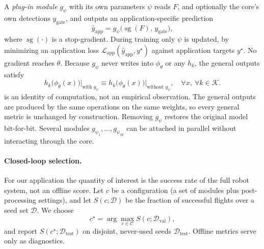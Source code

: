 \documentclass[10pt,twocolumn,letterpaper]{article}
\begin{document}
A \emph{plug-in module} $g_\psi$ with its own parameters $\psi$ reads $F$, and optionally the core's own detections $y_{\text{gate}}$, and outputs an application-specific prediction
\begin{equation}
  \hat{y}_{\text{app}} = g_\psi\big(\operatorname{sg}(F),\, y_{\text{gate}}\big),
  \label{eq:module}
\end{equation}
where $\operatorname{sg}(\cdot)$ is a stop-gradient. During training only $\psi$ is updated, by minimizing an application loss $\mathcal{L}_{\text{app}}(\hat{y}_{\text{app}}, y^\star)$ against application targets $y^\star$. No gradient reaches $\theta$. Because $g_\psi$ never writes into $\phi_\theta$ or any $h_k$, the general outputs satisfy
\begin{equation}
  h_k\big(\phi_\theta(x)\big)\big|_{\text{with } g_\psi} \equiv h_k\big(\phi_\theta(x)\big)\big|_{\text{without } g_\psi}, \quad \forall x,\ \forall k \in \mathcal{K}.
  \label{eq:nonregression}
\end{equation}
 is an identity of computation, not an empirical observation. The general outputs are produced by the same operations on the same weights, so every general metric is unchanged by construction. Removing $g_\psi$ restores the original model bit-for-bit. Several modules $g_{\psi_1},\dots,g_{\psi_M}$ can be attached in parallel without interacting through the core.

\paragraph{Closed-loop selection.}
For our application the quantity of interest is the success rate of the full robot system, not an offline score. Let $c$ be a configuration (a set of modules plus post-processing settings), and let $S(c; \mathcal{D})$ be the fraction of successful flights over a seed set $\mathcal{D}$. We choose
\begin{equation}
  c^\star = \arg\max_{c \in \mathcal{C}} S(c; \mathcal{D}_{\text{val}}),
  \label{eq:selection}
\end{equation}
and report $S(c^\star; \mathcal{D}_{\text{test}})$ on disjoint, never-used seeds $\mathcal{D}_{\text{test}}$. Offline metrics serve only as diagnostics.
\end{document}

